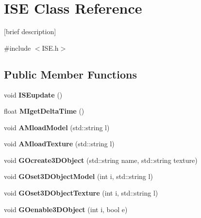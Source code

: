 \hypertarget{class_i_s_e}{\section{I\-S\-E Class Reference}
\label{class_i_s_e}
}


\mbox{[}brief description\mbox{]}  




{\ttfamily \#include $<$I\-S\-E.\-h$>$}

\subsection*{Public Member Functions}
\begin{DoxyCompactItemize}
\item 
\hypertarget{class_i_s_e_af6de6ea731783192c5657a9148561871}{void {\bfseries I\-S\-Eupdate} ()}\label{class_i_s_e_af6de6ea731783192c5657a9148561871}

\item 
\hypertarget{class_i_s_e_acdd404a57871611a26bef342f099d0a1}{float {\bfseries M\-Iget\-Delta\-Time} ()}\label{class_i_s_e_acdd404a57871611a26bef342f099d0a1}

\item 
\hypertarget{class_i_s_e_ae4a785680eecc677a8c3b8e25d46e3e3}{void {\bfseries A\-Mload\-Model} (std\-::string l)}\label{class_i_s_e_ae4a785680eecc677a8c3b8e25d46e3e3}

\item 
\hypertarget{class_i_s_e_aeb016fca4592015d0295b2139e9da7a6}{void {\bfseries A\-Mload\-Texture} (std\-::string l)}\label{class_i_s_e_aeb016fca4592015d0295b2139e9da7a6}

\item 
\hypertarget{class_i_s_e_ad3948af692b52ff73f48276f06f56fc4}{void {\bfseries G\-Ocreate3\-D\-Object} (std\-::string name, std\-::string texture)}\label{class_i_s_e_ad3948af692b52ff73f48276f06f56fc4}

\item 
\hypertarget{class_i_s_e_a1b2798117041860b8f63a234d358d7db}{void {\bfseries G\-Oset3\-D\-Object\-Model} (int i, std\-::string l)}\label{class_i_s_e_a1b2798117041860b8f63a234d358d7db}

\item 
\hypertarget{class_i_s_e_aaa9f3feea6622822d9399cd840f68081}{void {\bfseries G\-Oset3\-D\-Object\-Texture} (int i, std\-::string l)}\label{class_i_s_e_aaa9f3feea6622822d9399cd840f68081}

\item 
\hypertarget{class_i_s_e_a523f49982e18a389e8b8e860c000a4d1}{void {\bfseries G\-Oenable3\-D\-Object} (int i, bool e)}\label{class_i_s_e_a523f49982e18a389e8b8e860c000a4d1}


\end{DoxyCompactItemize}
